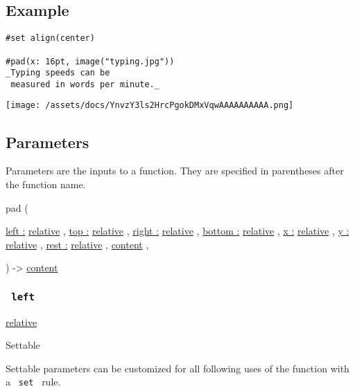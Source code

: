 \subsection{Example}\label{example}

\begin{verbatim}
#set align(center)

#pad(x: 16pt, image("typing.jpg"))
_Typing speeds can be
 measured in words per minute._
\end{verbatim}

\texttt{[image: /assets/docs/YnvzY3ls2HrcPgokDMxVqwAAAAAAAAAA.png]}

\subsection{\texorpdfstring{{ Parameters
}}{ Parameters }}\label{parameters}

\label{parameters-tooltip}
Parameters are the inputs to a function. They are specified in
parentheses after the function name.

{ pad } (

{ \hyperref[parameters-left]{left :}
\href{/docs/reference/layout/relative/}{relative} , } {
\hyperref[parameters-top]{top :}
\href{/docs/reference/layout/relative/}{relative} , } {
\hyperref[parameters-right]{right :}
\href{/docs/reference/layout/relative/}{relative} , } {
\hyperref[parameters-bottom]{bottom :}
\href{/docs/reference/layout/relative/}{relative} , } {
\hyperref[parameters-x]{x :}
\href{/docs/reference/layout/relative/}{relative} , } {
\hyperref[parameters-y]{y :}
\href{/docs/reference/layout/relative/}{relative} , } {
\hyperref[parameters-rest]{rest :}
\href{/docs/reference/layout/relative/}{relative} , } {
\href{/docs/reference/foundations/content/}{content} , }

) -\textgreater{} \href{/docs/reference/foundations/content/}{content}

\subsubsection{\texorpdfstring{\texttt{\ left\ }}{ left }}\label{parameters-left}

\href{/docs/reference/layout/relative/}{relative}

{{ Settable }}

\label{parameters-left-settable-tooltip}
Settable parameters can be customized for all following uses of the
function with a \texttt{\ set\ } rule.


